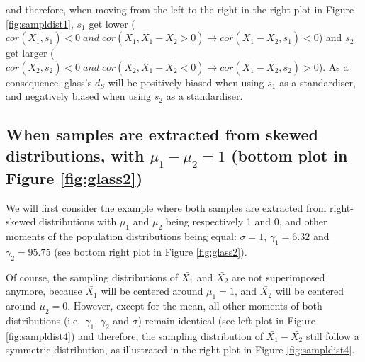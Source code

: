 \documentclass[
  man,floatsintext]{apa6}
\begin{document}
and therefore, when moving from the left to the right in the right plot in Figure \ref{fig:sampldist1}, \(s_1\) get lower (\(cor(\bar{X_1},s_1) < 0 \; and \; cor(\bar{X_1},\bar{X_1}-\bar{X_2}>0) \rightarrow cor(\bar{X_1}-\bar{X_2},s_1)<0\)) and \(s_2\) get larger (\(cor(\bar{X_2},s_2) < 0 \; and \; cor(\bar{X_2},\bar{X_1}-\bar{X_2}<0) \rightarrow cor(\bar{X_1}-\bar{X_2},s_2)>0\)). As a consequence, glass's \(d_S\) will be positively biased when using \(s_1\) as a standardiser, and negatively biased when using \(s_2\) as a standardiser.

\hypertarget{when-samples-are-extracted-from-skewed-distributions-with-mu_1-mu_21-bottom-plot-in-figure}{%
\subsection{\texorpdfstring{When samples are extracted from skewed distributions, with \textbf{\(\mu_1-\mu_2=1\)} (bottom plot in Figure \ref{fig:glass2})}{When samples are extracted from skewed distributions, with \textbackslash mu\_1-\textbackslash mu\_2=1 (bottom plot in Figure )}}\label{when-samples-are-extracted-from-skewed-distributions-with-mu_1-mu_21-bottom-plot-in-figure}}

We will first consider the example where both samples are extracted from right-skewed distributions with \(\mu_1\) and \(\mu_2\) being respectively 1 and 0, and other moments of the population distributions being equal: \(\sigma=1\), \(\gamma_1=6.32\) and \(\gamma_2=95.75\) (see bottom right plot in Figure \ref{fig:glass2}).

Of course, the sampling distributions of \(\bar{X_1}\) and \(\bar{X_2}\) are not superimposed anymore, because \(\bar{X_1}\) will be centered around \(\mu_1=1\), and \(\bar{X_2}\) will be centered around \(\mu_2=0\). However, except for the mean, all other moments of both distributions (i.e.~\(\gamma_1\), \(\gamma_2\) and \(\sigma\)) remain identical (see left plot in Figure \ref{fig:sampldist4}) and therefore, the sampling distribution of \(\bar{X_1}-\bar{X_2}\) still follow a symmetric distribution, as illustrated in the right plot in Figure \ref{fig:sampldist4}.
\end{document}
